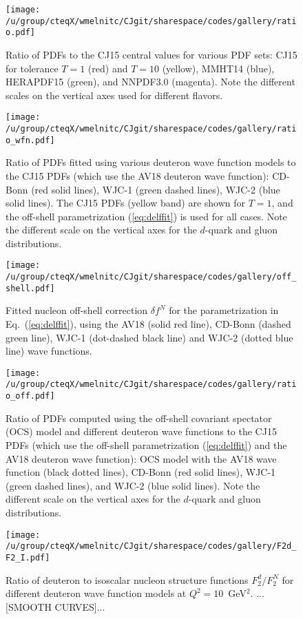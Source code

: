 \documentclass[aps,prd,amsmath,preprint]{revtex4}
\begin{document}
\begin{figure}[t]
\texttt{[image: /u/group/cteqX/wmelnitc/CJgit/sharespace/codes/gallery/ratio.pdf]}
\caption{Ratio of PDFs to the CJ15 central values for various PDF sets:
	CJ15 for tolerance $T=1$ (red) and $T=10$ (yellow),
	MMHT14 \cite{MMHT14} (blue),
	HERAPDF15 \cite{HERAPDF15} (green), and
	NNPDF3.0 \cite{NNPDF3.0} (magenta).
	Note the different scales on the vertical axes used for
	different flavors.}
\label{fig:ratio}
\end{figure} 


\begin{figure}[t]
\texttt{[image: /u/group/cteqX/wmelnitc/CJgit/sharespace/codes/gallery/ratio\_wfn.pdf]}
\caption{Ratio of PDFs fitted using various deuteron wave function models
	to the CJ15 PDFs (which use the AV18 deuteron wave function):
	CD-Bonn (red solid lines),
	WJC-1 (green dashed lines),
	WJC-2 (blue solid lines).
	The CJ15 PDFs (yellow band) are shown for $T=1$, and the
	off-shell parametrization (\ref{eq:delffit}) is used for
	all cases.  Note the different scale on the vertical axes
	for the	$d$-quark and gluon distributions.}
\label{fig:ratio_wfn}
\end{figure} 


\begin{figure}[t]
\texttt{[image: /u/group/cteqX/wmelnitc/CJgit/sharespace/codes/gallery/off\_shell.pdf]}
\caption{Fitted nucleon off-shell correction $\delta f^N$ for the
	parametrization in Eq.~(\ref{eq:delffit}), using the
	AV18 (solid red line), CD-Bonn (dashed green line),
	WJC-1 (dot-dashed black line) and WJC-2 (dotted blue line)
	wave functions.}
\label{fig:off_shell}
\end{figure} 


\begin{figure}[t]
\texttt{[image: /u/group/cteqX/wmelnitc/CJgit/sharespace/codes/gallery/ratio\_off.pdf]}
\caption{Ratio of PDFs computed using the off-shell covariant spectator
	(OCS) model and different deuteron wave functions to the CJ15
	PDFs (which use the off-shell parametrization (\ref{eq:delffit})
	and the AV18 deuteron wave function):
	OCS model with the AV18 wave function (black dotted lines),
	CD-Bonn (red solid lines),
	WJC-1 (green dashed lines), and
	WJC-2 (blue solid lines).
	Note the different scale on the vertical axes for the
	$d$-quark and gluon distributions.}
\label{fig:ratio_off}
\end{figure} 


\begin{figure}[t]
\texttt{[image: /u/group/cteqX/wmelnitc/CJgit/sharespace/codes/gallery/F2d\_F2\_I.pdf]}
\caption{Ratio of deuteron to isoscalar nucleon structure functions
	$F_2^d/F_2^N$ for different deuteron wave function models
	at $Q^2=10$~GeV$^2$.
	{\color{red} ...[SMOOTH CURVES]...}}
\label{fig:F2dN}
\end{figure}
\end{document}
